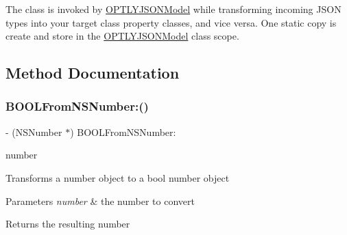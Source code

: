The class is invoked by \mbox{\hyperlink{interface_o_p_t_l_y_j_s_o_n_model}{O\+P\+T\+L\+Y\+J\+S\+O\+N\+Model}} while transforming incoming J\+S\+ON types into your target class property classes, and vice versa. One static copy is create and store in the \mbox{\hyperlink{interface_o_p_t_l_y_j_s_o_n_model}{O\+P\+T\+L\+Y\+J\+S\+O\+N\+Model}} class scope. 

\subsection{Method Documentation}
\mbox{\label{interface_o_p_t_l_y_j_s_o_n_value_transformer_a2d5951123bdc1165237f533c7200f9f7}} 
\subsubsection{\texorpdfstring{B\+O\+O\+L\+From\+N\+S\+Number\+:()}{BOOLFromNSNumber:()}}
{\footnotesize\ttfamily -\/ (N\+S\+Number $\ast$) B\+O\+O\+L\+From\+N\+S\+Number\+: \begin{DoxyParamCaption}\item[{(N\+S\+Number $\ast$)}]{number }\end{DoxyParamCaption}}

Transforms a number object to a bool number object 
\begin{DoxyParams}{Parameters}
{\em number} & the number to convert \\
\hline
\end{DoxyParams}
\begin{DoxyReturn}{Returns}
the resulting number 
\end{DoxyReturn}
\mbox{\label{interface_o_p_t_l_y_j_s_o_n_value_transformer_ae565407052a7ec2d2abcab67bd95f65d}} 
